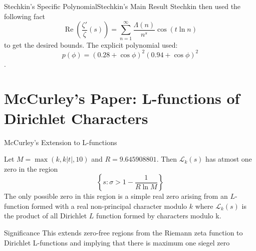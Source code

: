 \documentclass{beamer}
\def\Re{\operatorname{Re}}
\begin{document}
\begin{frame}{Stechkin's Specific Polynomial}{Stechkin's Main Result}
Stechkin then used the following fact \[
\Re\left(\frac{\zeta'}{\zeta}(s)\right) = \sum_{n=1}^{\infty} \frac{\Lambda(n)}{n^s}\cos(t\ln n) 
\] to get the desired bounds.
    The explicit polynomial used:
$$p(\phi) = (0.28 + \cos \phi)^2(0.94 + \cos \phi)^2 $$.
\end{frame}

\section{McCurley's Paper: L-functions of Dirichlet Characters}

\begin{frame}{McCurley's Extension to L-functions}
\begin{theorem}
    Let $M = \max (k, k|t|,10) $ and $R = 9.645908801$. Then $\mathcal{L}_k(s)$ has atmost one zero in the region \[
    \left\{s: \sigma >1-\frac{1}{R\ln M} \right\}
    \]
    The only possible zero in this region is a simple real zero arising from an $L$-
function formed with a real non-principal character modulo $k$ where  $\mathcal{L}_k(s)$  is the product of all Dirichlet $L$ function formed by  characters modulo k.
\end{theorem}
\vspace{0.3cm}

\begin{block}{Significance}
This extends zero-free regions from the Riemann zeta function to Dirichlet L-functions and implying that there is maximum one siegel zero
\end{block}
\end{frame}
\end{document}
